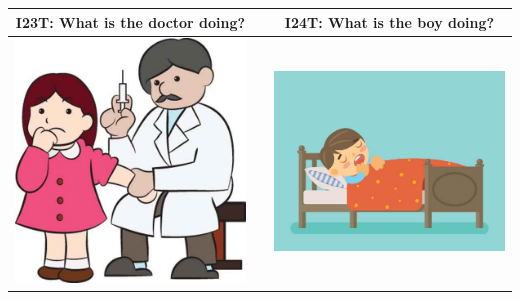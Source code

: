 \documentclass[12pt,notitlepage]{article}
\begin{document}
\begin{center}
\begin{tabular}{|c|c|c|}
\hline
I23T: What is the doctor doing? && I24T: What is the boy doing? \\
\hline
\includegraphics[width=20em,trim=0 0 0 -3]{figures/I23.jpg} & & \includegraphics[width=20em,trim=0 0 0 -3]{figures/I24.jpg} \\
\hline
\end{tabular}
\vspace{1em} \\



\end{center}
\end{document}
